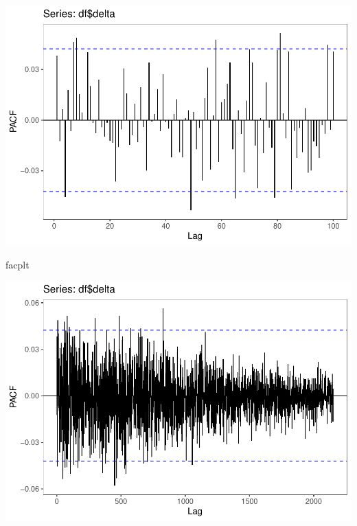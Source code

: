 \documentclass[11pt, a4paper]{report}
\newenvironment{Shaded}{\begin{snugshade}}{\end{snugshade}}
\newcommand{\DataTypeTok}[1]{\textcolor[rgb]{0.13,0.29,0.53}{#1}}
\newcommand{\DecValTok}[1]{\textcolor[rgb]{0.00,0.00,0.81}{#1}}
\newcommand{\KeywordTok}[1]{\textcolor[rgb]{0.13,0.29,0.53}{\textbf{#1}}}
\newcommand{\NormalTok}[1]{#1}
\newcommand{\OperatorTok}[1]{\textcolor[rgb]{0.81,0.36,0.00}{\textbf{#1}}}
\newcommand{\StringTok}[1]{\textcolor[rgb]{0.31,0.60,0.02}{#1}}
\theoremstyle{plain}
\theoremstyle{plain}
\theoremstyle{remark}
\begin{document}
\begin{center}\includegraphics{Econo2_P1_files/figure-latex/plots-7} \end{center}

\begin{Shaded}
\begin{Highlighting}[]
\NormalTok{facplt}
\end{Highlighting}
\end{Shaded}

\begin{center}\includegraphics{Econo2_P1_files/figure-latex/plots-8} \end{center}

\begin{Shaded}
\end{Shaded}
\end{document}
